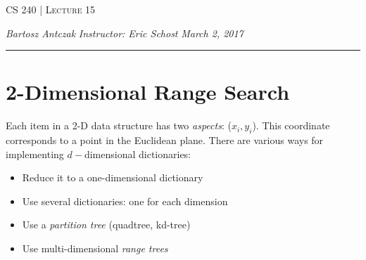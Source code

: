 \documentclass{report}
\newcommand{\lectureNum}{15}
\newcommand{\curDate}{March 2, 2017}
\newcommand{\course}{CS 240}
\begin{document}
\begin{center}
\begin{Large}
\textsc{\course{} | Lecture \lectureNum{}}
\end{Large}
\end{center} 
\noindent \textit{Bartosz Antczak} \hfill
\textit{Instructor: Eric Schost} \hfill
\textit{\curDate{}}
\rule{\textwidth}{0.4pt}

\section{2-Dimensional Range Search}
Each item in a 2-D data structure has two \textit{aspects}: ($x_i,y_i$). This coordinate corresponds to a point in the Euclidean plane. There are various ways for implementing $d-$dimensional dictionaries:
\begin{itemize}
\item Reduce it to a one-dimensional dictionary
\item Use several dictionaries: one for each dimension
\item Use a \textit{partition tree} (quadtree, kd-tree)
\item Use multi-dimensional \textit{range trees}
\end{itemize}
\end{document}
